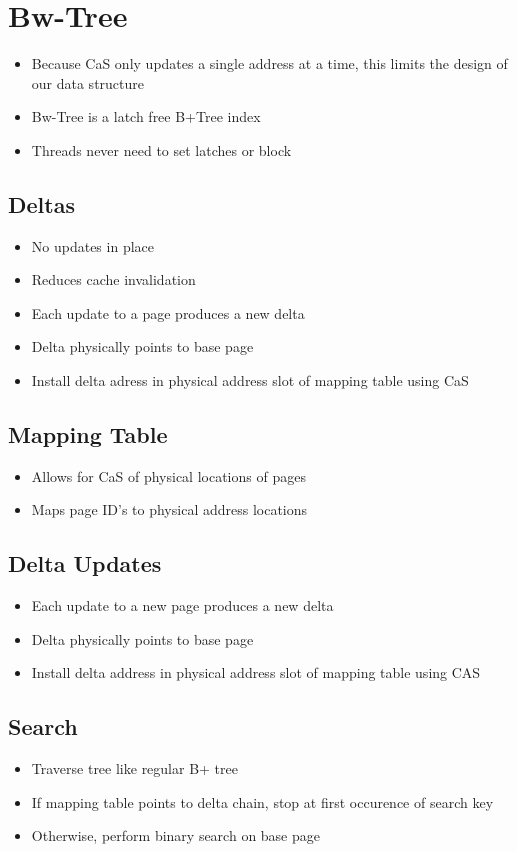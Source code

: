 \documentclass[11pt]{article}
\begin{document}
\section{Bw-Tree~\cite{bwtree-icde2013}}
\begin{itemize}
    \item Because CaS only updates a single address at a time, this limits the design of our data structure
    \item Bw-Tree is a latch free B+Tree index
    \item Threads never need to set latches or block
\end{itemize}
\subsection*{\textbf{Deltas}}
    \begin{itemize}
        \item No updates in place
        \item Reduces cache invalidation
        \item Each update to a page produces a new delta
        \item Delta physically points to base page
        \item Install delta adress in physical address slot of mapping table using CaS
    \end{itemize}

\subsection*{\textbf{Mapping Table}}
    \begin{itemize}
        \item Allows for CaS of physical locations of pages
        \item Maps page ID's to physical address locations
    \end{itemize}
\subsection*{Delta Updates}
    \begin{itemize}
        \item Each update to a new page produces a new delta
        \item Delta physically points to base page
        \item Install delta address in physical address slot of mapping table using CAS
    \end{itemize}
\subsection*{Search}
    \begin{itemize}
        \item Traverse tree like regular B+ tree
        \item If mapping table points to delta chain, stop at first occurence of search key
        \item Otherwise, perform binary search on base page
    \end{itemize}
\end{document}
